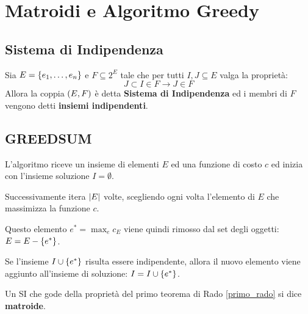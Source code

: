 \documentclass[\main/main.tex]{subfiles}
\begin{document}
\chapter{Matroidi e Algoritmo Greedy}
\section{Sistema di Indipendenza}
\begin{definition}
  Sia \(E = \left\{e_1, \ldots, e_n\right\}\) e \(F \subseteq 2^E\) tale che per tutti \(I, J \subseteq E\) valga la proprietà:
  \[
    J \subset I \in F \rightarrow J \in F
  \]
  Allora la coppia \(\left(E, F\right)\) è detta \textbf{Sistema di Indipendenza} ed i membri di \(F\) vengono detti \textbf{insiemi indipendenti}.
\end{definition}
\section{GREEDSUM}
L'algoritmo riceve un insieme di elementi \(E\) ed una funzione di costo \(c\) ed inizia con l'insieme soluzione \(I = \emptyset \).

Successivamente itera \(\left\lvert E\right\rvert\) volte, scegliendo ogni volta l'elemento di \(E\) che massimizza la funzione \(c\).

Questo elemento \(e^* = \max_e c_{E}\) viene quindi rimosso dal set degli oggetti: \(E = E - \left\{e^*\right\}\).

Se l'insieme \(I \cup \left\{e^*\right\}\) risulta essere indipendente, allora il nuovo elemento viene aggiunto all'insieme di soluzione: \(I = I \cup \left\{e^*\right\}\).
\begin{definition}[Matroide]
  Un SI che gode della proprietà del primo teorema di Rado \ref{primo_rado} si dice \textbf{matroide}.
\end{definition}
\clearpage
\end{document}
